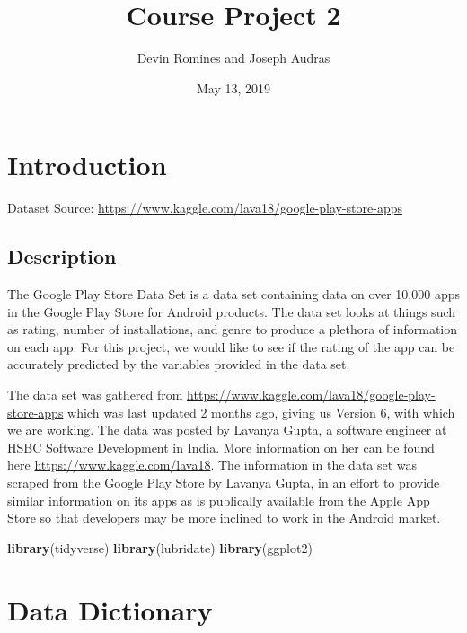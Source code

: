 \documentclass[]{article}
\title{Course Project 2}
\author{Devin Romines and Joseph Audras}
\date{May 13, 2019}
\newenvironment{Shaded}{\begin{snugshade}}{\end{snugshade}}
\newcommand{\KeywordTok}[1]{\textcolor[rgb]{0.13,0.29,0.53}{\textbf{{#1}}}}
\newcommand{\NormalTok}[1]{{#1}}
\begin{document}
\maketitle

\section{Introduction}\label{introduction}

Dataset Source:
\url{https://www.kaggle.com/lava18/google-play-store-apps}

\subsection{Description}\label{description}

The Google Play Store Data Set is a data set containing data on over
10,000 apps in the Google Play Store for Android products. The data set
looks at things such as rating, number of installations, and genre to
produce a plethora of information on each app. For this project, we
would like to see if the rating of the app can be accurately predicted
by the variables provided in the data set.

The data set was gathered from
\url{https://www.kaggle.com/lava18/google-play-store-apps} which was
last updated 2 months ago, giving us Version 6, with which we are
working. The data was posted by Lavanya Gupta, a software engineer at
HSBC Software Development in India. More information on her can be found
here \url{https://www.kaggle.com/lava18}. The information in the data
set was scraped from the Google Play Store by Lavanya Gupta, in an
effort to provide similar information on its apps as is publically
available from the Apple App Store so that developers may be more
inclined to work in the Android market.

\begin{Shaded}
\begin{Highlighting}[]
\KeywordTok{library}\NormalTok{(tidyverse)}
\KeywordTok{library}\NormalTok{(lubridate)}
\KeywordTok{library}\NormalTok{(ggplot2)}
\end{Highlighting}
\end{Shaded}

\section{Data Dictionary}\label{data-dictionary}
\end{document}
